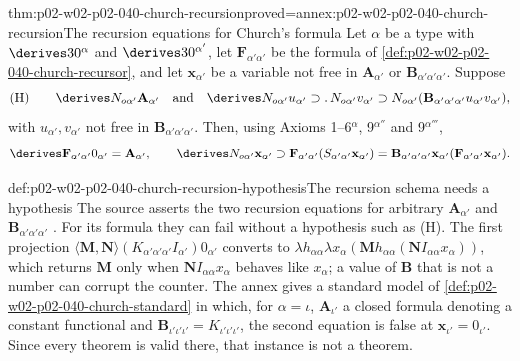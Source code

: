 \begin{hbtheorem}{thm:p02-w02-p02-040-church-recursion}{proved=annex:p02-w02-p02-040-church-recursion}{The recursion equations for Church's formula}
Let \(\alpha\) be a type with \(\derives30^\alpha\) and \(\derives30^{\alpha'}\),
let \(\mathbf F_{\alpha'\alpha'}\) be the formula of
\cref{def:p02-w02-p02-040-church-recursor}, and let \(\mathbf x_{\alpha'}\) be
a variable not free in \(\mathbf A_{\alpha'}\) or \(\mathbf B_{\alpha'\alpha'\alpha'}\).
Suppose
\[
 \text{(H)}\qquad\derives N_{o\alpha'}\mathbf A_{\alpha'}\quad\text{and}\quad
 \derives N_{o\alpha'}u_{\alpha'}\supset.\,N_{o\alpha'}v_{\alpha'}\supset
 N_{o\alpha'}(\mathbf B_{\alpha'\alpha'\alpha'}u_{\alpha'}v_{\alpha'}),
\]
with \(u_{\alpha'},v_{\alpha'}\) not free in \(\mathbf B_{\alpha'\alpha'\alpha'}\).
Then, using Axioms 1--6\(^\alpha\), 9\(^{\alpha''}\) and 9\(^{\alpha'''}\),
\[
 \derives\mathbf F_{\alpha'\alpha'}0_{\alpha'}=\mathbf A_{\alpha'},\qquad
 \derives N_{o\alpha'}\mathbf x_{\alpha'}\supset
 \mathbf F_{\alpha'\alpha'}(S_{\alpha'\alpha'}\mathbf x_{\alpha'})=
 \mathbf B_{\alpha'\alpha'\alpha'}\mathbf x_{\alpha'}(\mathbf F_{\alpha'\alpha'}\mathbf x_{\alpha'}).
\]
\end{hbtheorem}

\begin{hbwarning}{def:p02-w02-p02-040-church-recursion-hypothesis}{The recursion schema needs a hypothesis}
The source asserts the two recursion equations for arbitrary
\(\mathbf A_{\alpha'}\) and \(\mathbf B_{\alpha'\alpha'\alpha'}\)
\cite[\S8, p.~68]{Church1940}.  For its formula they can fail without a
hypothesis such as (H).  The first projection
\(\langle\mathbf M,\mathbf N\rangle(K_{\alpha'\alpha'\alpha'}I_{\alpha'})0_{\alpha'}\)
converts to \(\lambda h_{\alpha\alpha}\lambda x_\alpha(\mathbf M h_{\alpha\alpha}(\mathbf N I_{\alpha\alpha}x_\alpha))\),
which returns \(\mathbf M\) only when \(\mathbf N I_{\alpha\alpha}x_\alpha\) behaves
like \(x_\alpha\); a value of \(\mathbf B\) that is not a number can corrupt the
counter.  The annex gives a standard model of
\cref{def:p02-w02-p02-040-church-standard} in which, for
\(\alpha=\iota\), \(\mathbf A_{\iota'}\) a closed formula denoting a constant
functional and \(\mathbf B_{\iota'\iota'\iota'}=K_{\iota'\iota'\iota'}\), the
second equation is false at \(\mathbf x_{\iota'}=0_{\iota'}\).  Since every
theorem is valid there, that instance is not a theorem.
\end{hbwarning}

